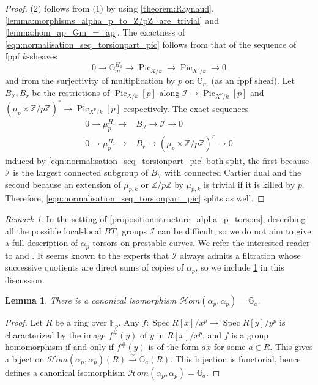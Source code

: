 \documentclass[a4paper,11pt]{amsart} %
\numberwithin{equation}{subsection}
\newcommand{\on}[1]{\operatorname{#1}}
\newcommand{\bb}[1]{{\mathbb{#1}}}
\newcommand{\ca}[1]{{\mathcal{#1}}}
\def\sheafhom{\mathcal{H}om}
\newcommand{\lra}{\longrightarrow}
\newcommand{\iso}{\stackrel{\sim}{\lra}}
\newcommand{\Spec}{\operatorname{Spec}}
\theoremstyle{definition}
\theoremstyle{plain}%
\newtheorem{lemma}[definition]{Lemma}
\theoremstyle{remark}
\newtheorem{remark}[definition]{Remark}
\begin{document}
\begin{proof}
    (2) follows from (1) by using \ref{theorem:Raynaud}, \ref{lemma:morphisms_alpha_p_to_Z/pZ_are_trivial} and \ref{lemma:hom_ap_Gm_=_ap}. The exactness of \ref{eqn:normalisation_seq_torsionpart_pic} follows from that of the sequence of fppf $k$-sheaves
    \[
    0 \to \bb G_m^{H_1} \to \on{Pic}_{X/k} \to \on{Pic}_{X^\nu/k} \to 0
    \]
    and from the surjectivity of multiplication by $p$ on $\bb G_m$ (as an fppf sheaf). Let $B_{\ca I},B_r$ be the restrictions of $\on{Pic}_{X/k}[p]$ along $\ca I \to \on{Pic}_{X^\nu/k}[p]$ and $(\mu_p \times \bb Z/p\bb Z)^r \to \on{Pic}_{X^\nu/k}[p]$ respectively. The exact sequences
    \begin{align*}
        0 \to \bb \mu_p^{H_1} \to & B_{\ca I} \to \ca I \to 0 \\
        0 \to \bb \mu_p^{H_1} \to & B_r \to (\mu_p \times \bb Z/p\bb Z)^r \to 0
    \end{align*}
    induced by \ref{eqn:normalisation_seq_torsionpart_pic} both split, the first because $\ca I$ is the largest connected subgroup of $B_{\ca I}$ with connected Cartier dual and the second because an extension of $\mu_{p,k}$ or $\bb Z/p\bb Z$ by $\mu_{p,k}$ is trivial if it is killed by $p$. Therefore, \ref{eqn:normalisation_seq_torsionpart_pic} splits as well.
\end{proof}

\begin{remark}\label{remark:alpha_p_tors_on_nodal_curve}
    In the setting of \ref{proposition:structure_alpha_p_torsors}, describing all the possible local-local $BT_1$ groups $\ca I$ can be difficult, so we do not aim to give a full description of $\alpha_p$-torsors on prestable curves. We refer the interested reader to \cite{PriesShortGuidepTorsion} and \cite{Oort2001}. It seems known to the experts that $\ca I$ always admits a filtration whose successive quotients are direct sums of copies of $\alpha_p$, so we include \ref{proposition:hom_ap_ap_=_Ga} in this discussion. 
\end{remark}

\begin{lemma}\label{proposition:hom_ap_ap_=_Ga}
    There is a canonical isomorphism $\sheafhom(\alpha_p,\alpha_p)=\bb G_a$.
\end{lemma}

\begin{proof}
    Let $R$ be a ring over $\bb F_p$. Any $f \colon \Spec R[x]/x^p \to \Spec R[y]/y^p$ is characterized by the image $f^\#(y)$ of $y$ in $R[x]/x^p$, and $f$ is a group homomorphism if and only if $f^\#(y)$ is of the form $ax$ for some $a\in R$. This gives a bijection $\sheafhom(\alpha_p,\alpha_p)(R) \iso \bb G_a(R)$. This bijection is functorial, hence defines a canonical isomorphism $\sheafhom(\alpha_p,\alpha_p)=\bb G_a$.
\end{proof}
\end{document}

